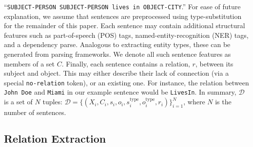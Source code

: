 ``\texttt{\textcolor{our_blue}{SUBJECT-PERSON SUBJECT-PERSON} lives in \textcolor{our_red}{OBJECT-CITY}}.''
For ease of future explanation, we assume that sentences are preprocessed using type-substitution for the remainder of this paper.
Each sentence may contain additional structural features such as part-of-speech (POS) tags, named-entity-recognition (NER) tags, and a dependency parse. Analogous to extracting entity types, these can be generated from parsing frameworks. 
We denote all such sentence features as members of a set $C$.
Finally, each sentence contains a relation, $r$, between its subject and object. 
This may either describe their lack of connection (via a special \texttt{no-relation} token), or an existing one.
For instance, the relation between \textcolor{our_blue}{\texttt{John Doe}} and \textcolor{our_red}{\texttt{Miami}} in our example sentence would be \texttt{LivesIn}.
In summary, $\mathcal{D}$ is a set of $N$ tuples: $\mathcal{D} = \{ ( X_i, C_i, s_i, o_i, s^{\textrm{type}}_i, o^{\textrm{type}}_i, r_i ) \}_{i=1}^N$, where $N$ is the number of sentences.

\subsection{Relation Extraction}
\label{sec:re-task}


